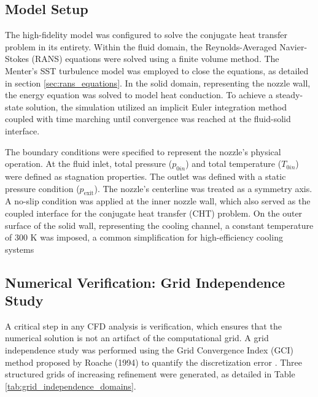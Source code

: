 \documentclass[tg, EN]{ufabcFHZh_tg}
\begin{document}
\subsection{Model Setup}

The high-fidelity model was configured to solve the conjugate heat transfer problem in its entirety. Within the fluid domain, the Reynolds-Averaged Navier-Stokes (RANS) equations were solved using a finite volume method. The Menter's SST turbulence model was employed to close the equations, as detailed in section \ref{sec:rans_equations}. In the solid domain, representing the nozzle wall, the energy equation was solved to model heat conduction. To achieve a steady-state solution, the simulation utilized an implicit Euler integration method coupled with time marching until convergence was reached at the fluid-solid interface.

The boundary conditions were specified to represent the nozzle's physical operation. At the fluid inlet, total pressure ($p_{0in}$) and total temperature ($T_{0in}$) were defined as stagnation properties. The outlet was defined with a static pressure condition ($p_{\text{exit}}$). The nozzle's centerline was treated as a symmetry axis. A no-slip condition was applied at the inner nozzle wall, which also served as the coupled interface for the conjugate heat transfer (CHT) problem. On the outer surface of the solid wall, representing the cooling channel, a constant temperature of 300 K was imposed, a common simplification for high-efficiency cooling systems %


\subsection{Numerical Verification: Grid Independence Study}

A critical step in any CFD analysis is verification, which ensures that the numerical solution is not an artifact of the computational grid. A grid independence study was performed using the Grid Convergence Index (GCI) method proposed by Roache (1994) to quantify the discretization error \citep{moreira2023}. Three structured grids of increasing refinement were generated, as detailed in Table \ref{tab:grid_independence_domains}.
\end{document}
